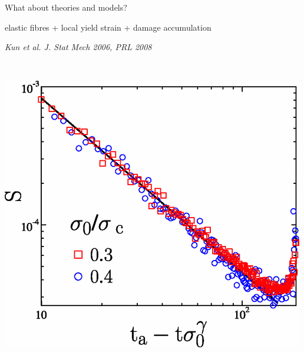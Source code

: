\begin{frame}{What about theories and models?}

elastic fibres + local yield strain + damage accumulation
\begin{block}{\textit{\footnotesize Kun et al. J. Stat Mech 2006, PRL 2008}}
\begin{columns}
\,
\includegraphics[height=5\baselineskip]{Kun_2008_Basquin}\,

\end{columns}
\end{block}
\end{frame}
